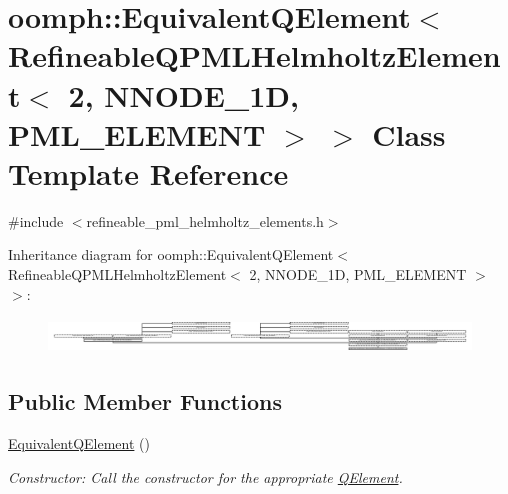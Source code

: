 \hypertarget{classoomph_1_1EquivalentQElement_3_01RefineableQPMLHelmholtzElement_3_012_00_01NNODE__1D_00_01PML__ELEMENT_01_4_01_4}{}\section{oomph\+:\+:Equivalent\+Q\+Element$<$ Refineable\+Q\+P\+M\+L\+Helmholtz\+Element$<$ 2, N\+N\+O\+D\+E\+\_\+1D, P\+M\+L\+\_\+\+E\+L\+E\+M\+E\+NT $>$ $>$ Class Template Reference}
\label{classoomph_1_1EquivalentQElement_3_01RefineableQPMLHelmholtzElement_3_012_00_01NNODE__1D_00_01PML__ELEMENT_01_4_01_4}


{\ttfamily \#include $<$refineable\+\_\+pml\+\_\+helmholtz\+\_\+elements.\+h$>$}

Inheritance diagram for oomph\+:\+:Equivalent\+Q\+Element$<$ Refineable\+Q\+P\+M\+L\+Helmholtz\+Element$<$ 2, N\+N\+O\+D\+E\+\_\+1D, P\+M\+L\+\_\+\+E\+L\+E\+M\+E\+NT $>$ $>$\+:\begin{figure}[H]
\begin{center}
\leavevmode
\includegraphics[height=0.931780cm]{classoomph_1_1EquivalentQElement_3_01RefineableQPMLHelmholtzElement_3_012_00_01NNODE__1D_00_01PML__ELEMENT_01_4_01_4}
\end{center}
\end{figure}
\subsection*{Public Member Functions}
\begin{DoxyCompactItemize}
\item 
\hyperlink{classoomph_1_1EquivalentQElement_3_01RefineableQPMLHelmholtzElement_3_012_00_01NNODE__1D_00_01PML__ELEMENT_01_4_01_4_a250043c1a297eba0a87ff9b127025061}{Equivalent\+Q\+Element} ()
\begin{DoxyCompactList}\small\item\em Constructor\+: Call the constructor for the appropriate \hyperlink{classoomph_1_1QElement}{Q\+Element}. \end{DoxyCompactList}\end{DoxyCompactItemize}
